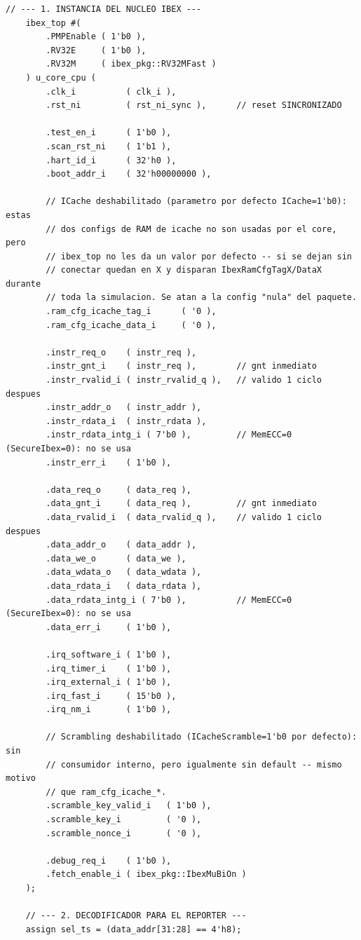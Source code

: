 \begin{lstlisting}[style=verilogstyle, basicstyle=\ttfamily\footnotesize, caption={Codigo fuente del subsistema \texttt{ibex\_bram\_subsystem.sv}}, label={code:ibex_bram_subsystem}]
    // --- 1. INSTANCIA DEL NUCLEO IBEX ---
    ibex_top #(
        .PMPEnable ( 1'b0 ),
        .RV32E     ( 1'b0 ),
        .RV32M     ( ibex_pkg::RV32MFast )
    ) u_core_cpu (
        .clk_i          ( clk_i ),
        .rst_ni         ( rst_ni_sync ),      // reset SINCRONIZADO

        .test_en_i      ( 1'b0 ),
        .scan_rst_ni    ( 1'b1 ),
        .hart_id_i      ( 32'h0 ),
        .boot_addr_i    ( 32'h00000000 ),

        // ICache deshabilitado (parametro por defecto ICache=1'b0): estas
        // dos configs de RAM de icache no son usadas por el core, pero
        // ibex_top no les da un valor por defecto -- si se dejan sin
        // conectar quedan en X y disparan IbexRamCfgTagX/DataX durante
        // toda la simulacion. Se atan a la config "nula" del paquete.
        .ram_cfg_icache_tag_i      ( '0 ),
        .ram_cfg_icache_data_i     ( '0 ),

        .instr_req_o    ( instr_req ),
        .instr_gnt_i    ( instr_req ),        // gnt inmediato
        .instr_rvalid_i ( instr_rvalid_q ),   // valido 1 ciclo despues
        .instr_addr_o   ( instr_addr ),
        .instr_rdata_i  ( instr_rdata ),
        .instr_rdata_intg_i ( 7'b0 ),         // MemECC=0 (SecureIbex=0): no se usa
        .instr_err_i    ( 1'b0 ),

        .data_req_o     ( data_req ),
        .data_gnt_i     ( data_req ),         // gnt inmediato
        .data_rvalid_i  ( data_rvalid_q ),    // valido 1 ciclo despues
        .data_addr_o    ( data_addr ),
        .data_we_o      ( data_we ),
        .data_wdata_o   ( data_wdata ),
        .data_rdata_i   ( data_rdata ),
        .data_rdata_intg_i ( 7'b0 ),          // MemECC=0 (SecureIbex=0): no se usa
        .data_err_i     ( 1'b0 ),

        .irq_software_i ( 1'b0 ),
        .irq_timer_i    ( 1'b0 ),
        .irq_external_i ( 1'b0 ),
        .irq_fast_i     ( 15'b0 ),
        .irq_nm_i       ( 1'b0 ),

        // Scrambling deshabilitado (ICacheScramble=1'b0 por defecto): sin
        // consumidor interno, pero igualmente sin default -- mismo motivo
        // que ram_cfg_icache_*.
        .scramble_key_valid_i   ( 1'b0 ),
        .scramble_key_i         ( '0 ),
        .scramble_nonce_i       ( '0 ),

        .debug_req_i    ( 1'b0 ),
        .fetch_enable_i ( ibex_pkg::IbexMuBiOn )
    );

    // --- 2. DECODIFICADOR PARA EL REPORTER ---
    assign sel_ts = (data_addr[31:28] == 4'h8);


\end{lstlisting}
